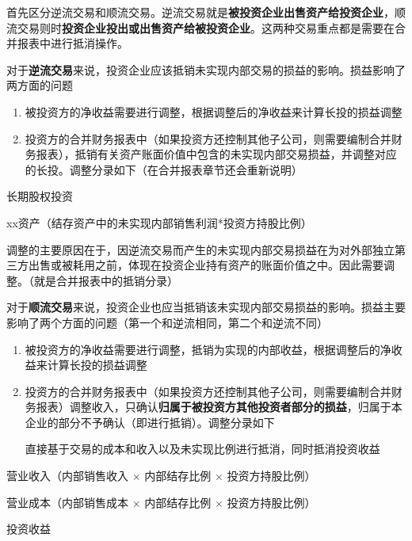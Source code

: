 \documentclass[UTF8,12pt]{ctexart}
\newenvironment{Dr}{%
	\begin{list}{}%
		{
			\setlength{\leftmargin}{2em}
			\setlength{\labelwidth}{2em}
			\setlength{\labelsep}{0pt}
			\setlength{\itemindent}{0pt}
			\setlength{\listparindent}{0pt}
			\setlength{\parsep}{0pt}
			\setlength{\topsep}{0pt}
		}
		\item[\textbf{借：}]
	}{%
	\end{list}
}
\newenvironment{Cr}{%
	\begin{list}{}%
		{
			\setlength{\leftmargin}{3em}
			\setlength{\labelwidth}{2em}
			\setlength{\labelsep}{0pt}
			\setlength{\itemindent}{0pt}
			\setlength{\listparindent}{0pt}
			\setlength{\parsep}{0pt}
			\setlength{\topsep}{0pt}
		}
		\item[\textbf{贷：}]
	}{%
	\end{list}
}
\numberwithin{equation}{section} %
\numberwithin{figure}{section}
\numberwithin{table}{section}
\begin{document}
	首先区分逆流交易和顺流交易。逆流交易就是\textbf{被投资企业出售资产给投资企业}，顺流交易则时\textbf{投资企业投出或出售资产给被投资企业}。这两种交易重点都是需要在合并报表中进行抵消操作。
	
	对于\textbf{逆流交易}来说，投资企业应该抵销未实现内部交易的损益的影响。损益影响了两方面的问题
	\begin{enumerate}
		\item 被投资方的净收益需要进行调整，根据调整后的净收益来计算长投的损益调整
		
		\item 投资方的合并财务报表中（如果投资方还控制其他子公司，则需要编制合并财务报表），抵销有关资产账面价值中包含的未实现内部交易损益，并调整对应的长投。调整分录如下（在合并报表章节还会重新说明）
	\end{enumerate}
	
	\begin{Dr}
		长期股权投资
	\end{Dr}
	\begin{Cr}
		xx资产（结存资产中的未实现内部销售利润*投资方持股比例）
	\end{Cr}
	
	调整的主要原因在于，因逆流交易而产生的未实现内部交易损益在为对外部独立第三方出售或被耗用之前，体现在投资企业持有资产的账面价值之中。因此需要调整。（就是合并报表中的抵销分录）
	
	对于\textbf{顺流交易}来说，投资企业也应当抵销该未实现内部交易损益的影响。损益主要影响了两个方面的问题（第一个和逆流相同，第二个和逆流不同）
	\begin{enumerate}
		\item 被投资方的净收益需要进行调整，抵销为实现的内部收益，根据调整后的净收益来计算长投的损益调整
		
		\item 投资方的合并财务报表中（如果投资方还控制其他子公司，则需要编制合并财务报表）调整收入，只确认\textbf{归属于被投资方其他投资者部分的损益}，归属于本企业的部分不予确认（即进行抵销）。调整分录如下
		
		直接基于交易的成本和收入以及未实现比例进行抵消，同时抵消投资收益
	\end{enumerate}
	
	\begin{Dr}
		营业收入（内部销售收入 $\times$ 内部结存比例 $\times$ 投资方持股比例）
	\end{Dr}
	\begin{Cr}
		营业成本（内部销售成本 $\times$ 内部结存比例 $\times$ 投资方持股比例）
		
		投资收益
	\end{Cr}
	
\end{document}
